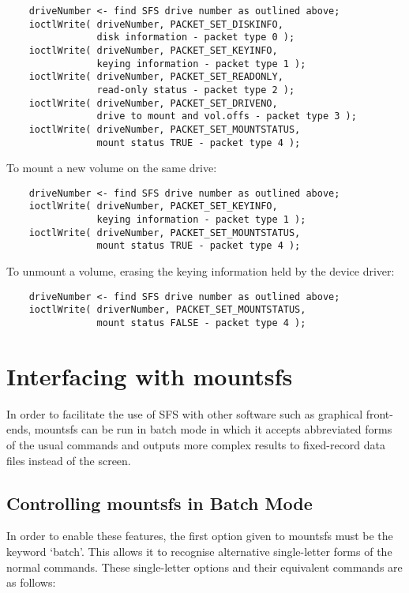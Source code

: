 \begin{verbatim}
    driveNumber <- find SFS drive number as outlined above;
    ioctlWrite( driveNumber, PACKET_SET_DISKINFO,
                disk information - packet type 0 );
    ioctlWrite( driveNumber, PACKET_SET_KEYINFO,
                keying information - packet type 1 );
    ioctlWrite( driveNumber, PACKET_SET_READONLY,
                read-only status - packet type 2 );
    ioctlWrite( driveNumber, PACKET_SET_DRIVENO,
                drive to mount and vol.offs - packet type 3 );
    ioctlWrite( driveNumber, PACKET_SET_MOUNTSTATUS,
                mount status TRUE - packet type 4 );
\end{verbatim}

To mount a new volume on the same drive:

\begin{verbatim}
    driveNumber <- find SFS drive number as outlined above;
    ioctlWrite( driveNumber, PACKET_SET_KEYINFO,
                keying information - packet type 1 );
    ioctlWrite( driveNumber, PACKET_SET_MOUNTSTATUS,
                mount status TRUE - packet type 4 );
\end{verbatim}

To unmount a volume, erasing the keying information held by the device driver:

\begin{verbatim}
    driveNumber <- find SFS drive number as outlined above;
    ioctlWrite( driverNumber, PACKET_SET_MOUNTSTATUS,
                mount status FALSE - packet type 4 );
\end{verbatim}


\section{Interfacing with mountsfs}

In order to facilitate the use of SFS with other software such as graphical
front-ends, mountsfs can be run in batch mode in which it accepts abbreviated
forms of the usual commands and outputs more complex results to fixed-record
data files instead of the screen.


\subsection{Controlling mountsfs in Batch Mode}

In order to enable these features, the first option given to mountsfs must be
the keyword `batch'.  This allows it to recognise alternative single-letter
forms of the normal commands.  These single-letter options and their equivalent
commands are as follows:

